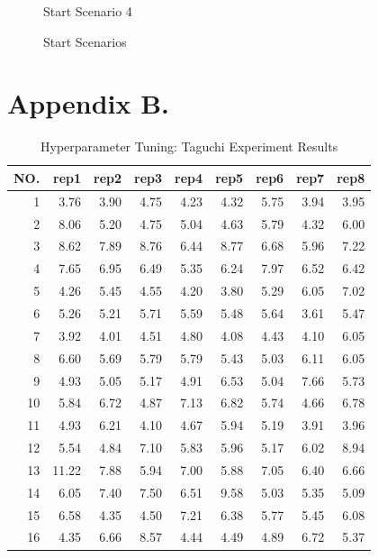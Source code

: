 \begin{figure}[ht]
\begin{minipage}[b]{0.5\linewidth}
		Start Scenario 4
	\end{minipage} 
	\caption{Start Scenarios}
	\label{fig:appendix:start_scenarios_3_4} 
\end{figure}


\chapter{Appendix B.}
\label{chap:appendix_b}

\begin{table}[ht]
	\centering
	\begin{tabular}{ rrrrrrrrr }
		\hline
		NO.& rep1 & rep2 & rep3 & rep4 & rep5 & rep6 & rep7 & rep8\\
  		\hline
		1 & 3.76 & 3.90 & 4.75 & 4.23 & 4.32 & 5.75 & 3.94 & 3.95 \\ 
		2 & 8.06 & 5.20 & 4.75 & 5.04 & 4.63 & 5.79 & 4.32 & 6.00 \\ 
		3 & 8.62 & 7.89 & 8.76 & 6.44 & 8.77 & 6.68 & 5.96 & 7.22 \\ 
		4 & 7.65 & 6.95 & 6.49 & 5.35 & 6.24 & 7.97 & 6.52 & 6.42 \\ 
		5 & 4.26 & 5.45 & 4.55 & 4.20 & 3.80 & 5.29 & 6.05 & 7.02 \\ 
		6 & 5.26 & 5.21 & 5.71 & 5.59 & 5.48 & 5.64 & 3.61 & 5.47 \\ 
		7 & 3.92 & 4.01 & 4.51 & 4.80 & 4.08 & 4.43 & 4.10 & 6.05 \\ 
		8 & 6.60 & 5.69 & 5.79 & 5.79 & 5.43 & 5.03 & 6.11 & 6.05 \\ 
		9 & 4.93 & 5.05 & 5.17 & 4.91 & 6.53 & 5.04 & 7.66 & 5.73 \\ 
		10 & 5.84 & 6.72 & 4.87 & 7.13 & 6.82 & 5.74 & 4.66 & 6.78 \\ 
		11 & 4.93 & 6.21 & 4.10 & 4.67 & 5.94 & 5.19 & 3.91 & 3.96 \\ 
		12 & 5.54 & 4.84 & 7.10 & 5.83 & 5.96 & 5.17 & 6.02 & 8.94 \\ 
		13 & 11.22 & 7.88 & 5.94 & 7.00 & 5.88 & 7.05 & 6.40 & 6.66 \\ 
		14 & 6.05 & 7.40 & 7.50 & 6.51 & 9.58 & 5.03 & 5.35 & 5.09 \\ 
		15 & 6.58 & 4.35 & 4.50 & 7.21 & 6.38 & 5.77 & 5.45 & 6.08 \\ 
		16 & 4.35 & 6.66 & 8.57 & 4.44 & 4.49 & 4.89 & 6.72 & 5.37 \\ 
		\hline
	\end{tabular}
	\caption{Hyperparameter Tuning: Taguchi Experiment Results}
	\label{tab:appendix:hyperparameter_tuning_final_taguchi}
\end{table}

